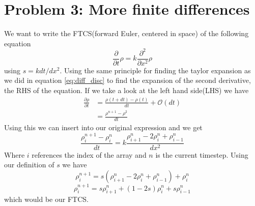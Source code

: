 \documentclass[10pt, a4paper]{amsart}
\begin{document}
\section{Problem 3: More finite differences}
We want to write the FTCS(forward Euler, centered in space) of the following equation 
\begin{equation}
\frac{\partial}{\partial t}\rho = k \frac{\partial^2}{\partial x^2 }\rho
\end{equation}
using $s = kdt/dx^2$.
Using the same principle for finding the taylor expansion as we did in equation \ref{eq:diff_disc} to find the expansion of the second derivative, the RHS of the equation. If we take a look at the left hand side(LHS) we have 
\begin{align}
\frac{\partial \rho}{\partial t} &= \frac{\rho(t+dt) - \rho(t)}{dt} + \mathcal{O}(dt)\\
&= \frac{\rho^{n+1} - \rho^2}{dt}
\end{align}
Using this we can insert into our original expression and we get 
\begin{equation}
\frac{\rho^{n+1}_i - \rho^n_i}{dt} = k \frac{\rho^n_{i+1}- 2\rho^n_{i} + \rho^n_{i-1}}{dx^2}
\end{equation}
Where $i$ references the index of the array and $n$ is the current timestep. Using our definition of $s$ we have 
\begin{equation}
\rho^{n+1}_i= s(\rho^n_{i+1}- 2\rho^n_{i} + \rho^n_{i-1}) +  \rho^n_i 
\end{equation}
\begin{equation}
\rho^{n+1}_i= s\rho^n_{i+1} + (1-2s)\rho^n_{i} + s\rho^n_{i-1} 
\end{equation}
which would be our FTCS. 
\end{document}
